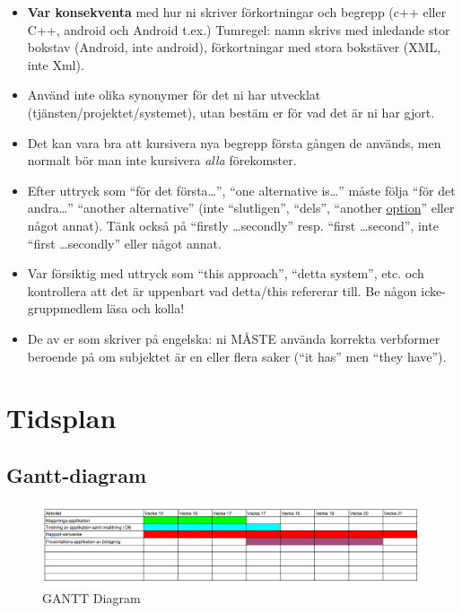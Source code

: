 \documentclass[swedish, a4paper,12pt]{article}
\begin{document}
\begin{itemize}
\item    \textbf{Var konsekventa} med hur ni skriver förkortningar och begrepp (c++ eller C++, android och Android t.ex.) Tumregel: namn skrivs med inledande stor bokstav (Android, inte android), förkortningar med stora bokstäver (XML, inte Xml).
\item    Använd inte olika synonymer för det ni har utvecklat (tjänsten/projektet/systemet), utan bestäm er för vad det är ni har gjort.

\item    Det kan vara bra att kursivera nya begrepp första gången de används, men normalt bör man inte kursivera \emph{alla} förekomster.

\item    Efter uttryck som ``för det första\ldots'', ``one alternative is\ldots'' måste följa ``för det andra\ldots'' ``another alternative'' (inte ``slutligen'', ``dels'', ``another \underline{option}'' eller något annat).  Tänk också på ``firstly \ldots secondly'' resp. ``first \ldots second'', inte ``first \ldots secondly'' eller något annat.

\item    Var försiktig med uttryck som ``this approach'', ``detta system'', etc. och kontrollera att det är uppenbart vad detta/this refererar till. Be någon icke-gruppmedlem läsa och kolla!

\item    De av er som skriver på engelska: ni MÅSTE använda korrekta verbformer beroende på om subjektet är en eller flera saker (``it has'' men ``they have'').
\end{itemize}
\fi
\section{Tidsplan}
\subsection{Gantt-diagram}

\begin{figure}[h]
	\includegraphics[width=15cm]{media/GANTT.png}
	\caption{GANTT Diagram}
	\label{}
\end{figure}
\end{document}
